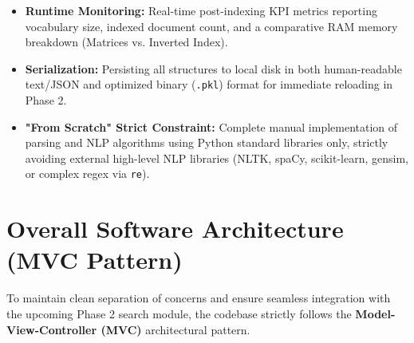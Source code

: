 \documentclass[11pt,a4paper]{article}
\begin{document}
\begin{itemize}[label=\textcolor{primaryblue}{\textbullet}]
    \begin{itemize}
        \item Document-Term Matrix (Rows = Terms, Columns = Documents);
        \item Term-Document Matrix (Rows = Documents, Columns = Terms);
        \item Inverted Index (Posting Lists per term).
    \end{itemize}
    \item \textbf{Runtime Monitoring:} Real-time post-indexing KPI metrics reporting vocabulary size, indexed document count, and a comparative RAM memory breakdown (Matrices vs. Inverted Index).
    \item \textbf{Serialization:} Persisting all structures to local disk in both human-readable text/JSON and optimized binary (\texttt{.pkl}) format for immediate reloading in Phase 2.
    \item \textbf{"From Scratch" Strict Constraint:} Complete manual implementation of parsing and NLP algorithms using Python standard libraries only, strictly avoiding external high-level NLP libraries (NLTK, spaCy, scikit-learn, gensim, or complex regex via \texttt{re}).
\end{itemize}

\section{Overall Software Architecture (MVC Pattern)}

To maintain clean separation of concerns and ensure seamless integration with the upcoming Phase 2 search module, the codebase strictly follows the \textbf{Model-View-Controller (MVC)} architectural pattern.
\end{document}
